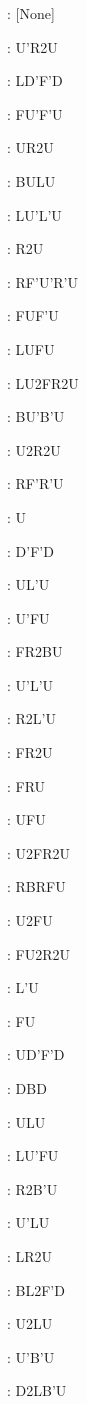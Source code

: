 \documentclass[9pt]{article}
\begin{document}
{\begin{multicols}{6}\small
{}: [None]

: U'R2U

: LD'F'D

: FU'F'U

: UR2U

: BULU

: LU'L'U

: R2U

: RF'U'R'U

: FUF'U

: LUFU

: LU2FR2U

: BU'B'U

: U2R2U

: RF'R'U

: U

: D'F'D

: UL'U

: U'FU

: FR2BU

: U'L'U

: R2L'U

: FR2U

: FRU

: UFU

: U2FR2U

: RBRFU

: U2FU

: FU2R2U

: L'U

: FU

: UD'F'D

: DBD

: ULU

: LU'FU

: R2B'U

: U'LU

: LR2U

: BL2F'D

: U2LU

: U'B'U

: D2LB'U


\end{multicols}}
\end{document}
